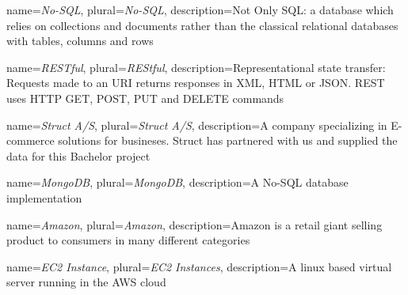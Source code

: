 
{
	name=\textit{No-SQL},
	plural=\textit{No-SQL},
	description={Not Only SQL: a database which relies on collections and documents rather than the classical relational databases with tables, columns and rows}
}

{
	name=\textit{RESTful},
	plural=\textit{REStful},
	description={Representational state transfer: Requests made to an URI returns responses in XML, HTML or JSON. REST uses HTTP GET, POST, PUT and DELETE commands}
}

{
	name=\textit{Struct A/S},
	plural=\textit{Struct A/S},
	description={A company specializing in E-commerce solutions for busineses. Struct has partnered with us and supplied the data for this Bachelor project}
}

{
	name=\textit{MongoDB},
	plural=\textit{MongoDB},
	description={A No-SQL database implementation}
}

{
	name=\textit{Amazon},
	plural=\textit{Amazon},
	description={Amazon is a retail giant selling product to consumers in many different categories}
}

{
	name=\textit{EC2 Instance},
	plural=\textit{EC2 Instances},
	description={A linux based virtual server running in the AWS cloud}
}
















